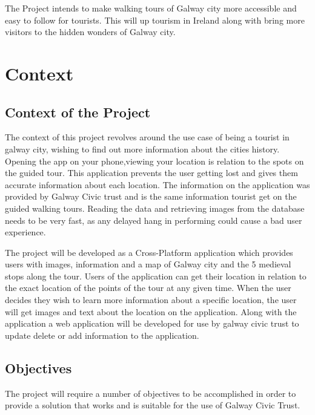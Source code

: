 The Project intends to make walking tours of Galway city more accessible and easy to follow for tourists. This will up tourism in Ireland along with bring more visitors to the hidden wonders of Galway city.

\chapter{Context}

\section{Context of the Project}

The context of this project revolves around the use case of being a tourist in galway city, wishing to find out more information about the cities history. Opening the app on your phone,viewing your location is relation to the spots on the guided tour. This application prevents the user getting lost and gives them accurate information about each location.  The information on the application was provided by Galway Civic trust and is the same information tourist get on the guided walking tours. Reading the data and retrieving images from the database needs to be very fast, as any delayed hang in performing could cause a bad user experience.

The project will be developed as a Cross-Platform application which provides users with images, information and a map of Galway city and the 5 medieval stops along the tour. Users of the application can get their location in relation to the exact location of the points of the tour at any given time. When the user decides they wish to learn more information about a specific location, the user will get images and text about the location on the application. Along with the application a web application will be developed for use by galway civic trust to update delete or add information to the application.

\section{Objectives} 


The project will require a number of objectives to be accomplished in order to provide a solution that works and is suitable for the use of Galway Civic Trust. 

